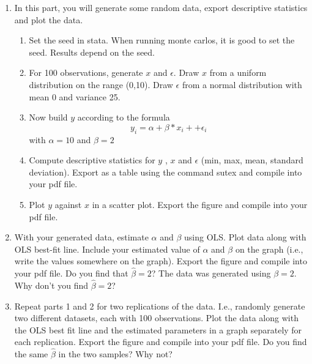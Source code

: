 \documentclass[11pt, a4paper]{article} %
\begin{document}
\begin{enumerate}
    \item In this part, you will generate some random data, export descriptive statistics and plot the data.
        \begin{enumerate}
            \item Set the seed in stata.  When running monte carlos, it is good to set the seed.  Results depend on the seed.
            
            \item For 100 observations, generate $x$ and $\epsilon$.  Draw $x$ from a uniform distribution on the range (0,10).  Draw $\epsilon$ from a normal distribution with mean 0 and variance 25.
            
            \item Now build $y$ according to the formula
                \begin{equation*}
                y_{i} = \alpha + \beta * x_{i} + + \epsilon_{i}
                \label{eq1}
                \end{equation*}with  $\alpha =10$ and  $\beta =2$
            
            \item Compute descriptive statistics for  $y$ , $x$ and $\epsilon$ (min, max, mean, standard deviation).  Export as a table using the command sutex and compile into your pdf file.
            
            \item Plot $y$ against $x$ in a scatter plot.  Export the figure and compile into your pdf file.
            
        \end{enumerate}
        
    \item With your generated data, estimate $\alpha$ and  $\beta$ using OLS.  Plot data along with OLS best-fit line.  Include your estimated value of $\alpha$ and  $\beta$ on the graph (i.e., write the values somewhere on the graph).  Export the figure and compile into your pdf file.  Do you find that $\hat\beta = 2$?  The data was generated using $\beta=2$.  Why don't you find $\hat\beta = 2$?
    
    \item Repeat parts 1 and 2 for two replications of the data.  I.e., randomly generate two different datasets, each with 100 observations.  Plot the data along with the OLS best fit line and the estimated parameters in a graph separately for each replication. Export the figure and compile into your pdf file.  Do you find the same $\hat\beta$ in the two samples?  Why not?
    

\end{enumerate}
\end{document}
